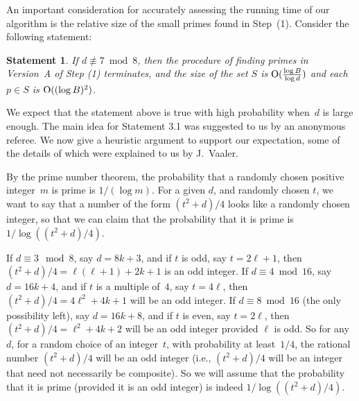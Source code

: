 \documentclass{amsart}
\newcommand{\bigo}{{\rm O}}
\theoremstyle{plain}
\newtheorem{stat}[lem]{Statement}
\begin{document}

An important consideration for accurately assessing the running time of 
our algorithm is the relative size of the small primes found in Step~(1). 
Consider the following statement:
\begin{stat} \label{estimate-stat}
If $d \not \equiv 7 \bmod 8$, then the procedure of finding primes 
in Version~A of Step (1) terminates, and  
the size of the set $S$ is $\bigo(\frac{\log B}{\log d})$ and
each $p \in S$ is $\bigo((\log B)^2)$.

\end{stat}
We expect that the statement above is true with high probability
when~$d$ is large enough. The main idea for Statement 3.1 was
suggested to us by an anonymous referee. We now give a heuristic
argument to support our expectation, some of the details
of which were explained to us by J.~Vaaler.

By the prime number theorem, the probability that a randomly chosen
positive integer~$m$ is prime is $1/(\log m)$.  For a given $d$,
and randomly chosen $t$, we want to say that a number of the form $(t^2+d)/4$
looks like a randomly chosen integer, so that we can claim that the probability that it is
prime is $1/\log((t^2+d)/4)$. 

If $d \equiv 3 \mod 8$, say $d = 8k + 3$, and  
if $t$ is odd, say $t = 2\ell + 1$, then $(t^2 + d)/4 = 
\ell (\ell+1) + 2k +1$ is an odd integer.
If $d \equiv 4 \bmod 16$, say $d = 16 k + 4$,
and if $t$ is a multiple of~$4$, 
say $t = 4 \ell$, then $(t^2 + d)/4 = 4 \ell^2 + 4k +1$
will be an odd integer.
If $d \equiv 8 \bmod 16$ (the only possibility left), 
say $d = 16 k + 8$,
and if $t$ is even, say $t = 2 \ell$, then $(t^2 + d)/4 = \ell^2 + 4k +2$
will be an odd integer provided $\ell$ is odd.
So for any~$d$, for a random choice of an integer~$t$,
with probability at least~$1/4$, the rational number $(t^2 + d)/4$ 
will be an odd integer
(i.e., $(t^2 + d)/4$ will be an integer that need not 
necessarily be composite).
So we will assume that the probability that it is prime 
(provided it is an odd integer) is indeed $1/\log((t^2+d)/4)$. 
\end{document}
